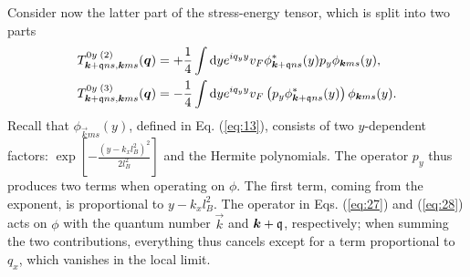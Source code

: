 Consider now the latter part of the stress-energy tensor, which is split into two parts
\begin{align}
  \label{eq:27}
  T ^{0y\; (2)} _{\bm{k}+\mathfrak{q}ns, \bm{k}ms} (\bm{q}) &= + 
                                                            \frac{1}{4}
                                                            \int \mathrm{d}y
                                                            e^{iq_y y} v_F
                                                            \phi ^{*}_{\bm{k}+\mathfrak{q} ns}(y)
                                                            p_y \phi _{\bm{k}ms} (y),\\
  \label{eq:28}
  T ^{0y\; (3)} _{\bm{k}+\mathfrak{q}ns, \bm{k}ms} (\bm{q}) &= -
                                                            \frac{1}{4}
                                                            \int \mathrm{d}y
                                                            e^{iq_y y} v_F
                                                            \left( p_y\phi ^{*}_{\bm{k}+\mathfrak{q} ns}(y) \right)
                                                            \phi _{\bm{k}ms}(y).
\end{align}
Recall that $\phi_{\vec{k}ms} (y)$, defined in Eq. (\ref{eq:13}), consists of two $y$-dependent factors:
\(
  \exp \left[-\frac{(y-k_x l_B^2)^2}{2 l_{B}^2 } \right]
\)
and the Hermite polynomials.
The operator $p_y$ thus produces two terms when operating on $\phi $.
The first term, coming from the exponent, is proportional to $y-k_xl_B^2$.
The operator in Eqs. (\ref{eq:27}) and (\ref{eq:28}) acts on $\phi $ with the quantum  number $\vec{k}$ and $\bm{k} + \mathfrak{q}$, respectively;
when summing the two contributions, everything thus cancels except for a term proportional to $q_x$, which vanishes in the local limit.

